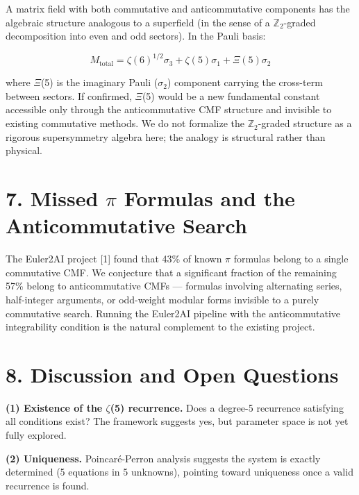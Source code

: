\documentclass[11pt]{article}
\begin{document}
A matrix field with both commutative and anticommutative components has
the algebraic structure analogous to a superfield (in the sense of a
\(\mathbb{Z}_{2}\)-graded decomposition into even and odd sectors). In
the Pauli basis:

\[M_{\text{total}} = \zeta(6)^{1/2}\sigma_3 + \zeta(5)\sigma_1 + \Xi(5)\sigma_2\]

where \(\Xi\)(5) is the imaginary Pauli (\(\sigma_{2}\)) component
carrying the cross-term between sectors. If confirmed, \(\Xi\)(5) would
be a new fundamental constant accessible only through the
anticommutative CMF structure and invisible to existing commutative
methods. We do not formalize the \(\mathbb{Z}_{2}\)-graded structure as
a rigorous supersymmetry algebra here; the analogy is structural rather
than physical.

\hypertarget{missed-formulas-and-the-anticommutative-search}{%
\section{\texorpdfstring{7. Missed \(\pi\) Formulas and the
Anticommutative
Search}{7. Missed  Formulas and the Anticommutative Search}}\label{missed-formulas-and-the-anticommutative-search}}

The Euler2AI project {[}1{]} found that 43\% of known \(\pi\) formulas
belong to a single commutative CMF. We conjecture that a significant
fraction of the remaining 57\% belong to anticommutative CMFs ---
formulas involving alternating series, half-integer arguments, or
odd-weight modular forms invisible to a purely commutative search.
Running the Euler2AI pipeline with the anticommutative integrability
condition is the natural complement to the existing project.

\hypertarget{discussion-and-open-questions}{%
\section{8. Discussion and Open
Questions}\label{discussion-and-open-questions}}

\textbf{(1) Existence of the \(\zeta\)(5) recurrence.} Does a degree-5
recurrence satisfying all conditions exist? The framework suggests yes,
but parameter space is not yet fully explored.

\textbf{(2) Uniqueness.} Poincaré-Perron analysis suggests the system is
exactly determined (5 equations in 5 unknowns), pointing toward
uniqueness once a valid recurrence is found.
\end{document}
